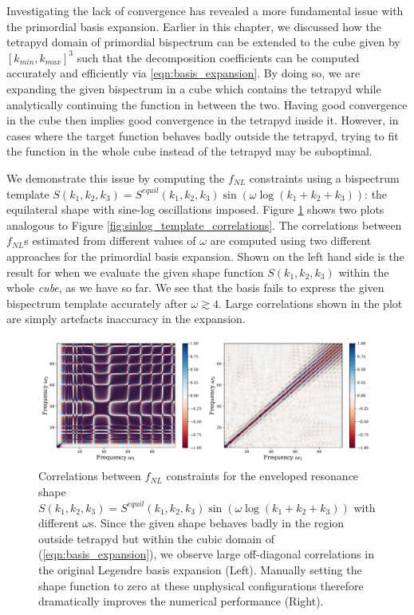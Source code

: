 Investigating the lack of convergence has revealed a more fundamental issue with the primordial basis expansion. Earlier in this chapter, we discussed how the tetrapyd domain of primordial bispectrum can be extended to the cube given by $[k_{min},k_{max}]^3$ such that the decomposition coefficients can be computed accurately and efficiently via \eqref{eqn:basis_expansion}. By doing so, we are expanding the given bispectrum in a cube which contains the tetrapyd while analytically continuing the function in between the two. Having good convergence in the cube then implies good convergence in the tetrapyd inside it. However, in cases where the target function behaves badly outside the tetrapyd, trying to fit the function in the whole cube instead of the tetrapyd may be suboptimal.

We demonstrate this issue by computing the $f_{NL}$ constraints using a bispectrum template $S(k_1,k_2,k_3) = S^{equil}(k_1,k_2,k_3) \sin(\omega \log(k_1+k_2+k_3))$: the equilateral shape with sine-log oscillations imposed. Figure \ref{fig:sinlog_equil_template_decomp_comparison} shows two plots analogous to Figure \ref{fig:sinlog_template_correlations}. The correlations between $f_{NL}$s estimated from different values of $\omega$ are computed using two different approaches for the primordial basis expansion. Shown on the left hand side is the result for when we evaluate the given shape function $S(k_1,k_2,k_3)$ within the whole \textit{cube}, as we have so far. We see that the basis fails to express the given bispectrum template accurately after $\omega\gtrsim4$. Large correlations shown in the plot are simply artefacts inaccuracy in the expansion.

\begin{figure}[htbp!] 
	\centering    
	\includegraphics[width=\textwidth]{sinlog_equil_template_correlations_compare_decomp.pdf}
	\caption{Correlations between $f_{NL}$ constraints for the enveloped resonance shape $S(k_1,k_2,k_3) = S^{equil}(k_1,k_2,k_3) \sin(\omega \log(k_1+k_2+k_3))$ with different $\omega$s. Since the given shape behaves badly in the region outside tetrapyd but within the cubic domain of (\ref{eqn:basis_expansion}), we observe large off-diagonal correlations in the original Legendre basis expansion (Left). Manually setting the shape function to zero at these unphysical configurations therefore dramatically improves the numerical performance (Right). }
	\label{fig:sinlog_equil_template_decomp_comparison}
\end{figure}

